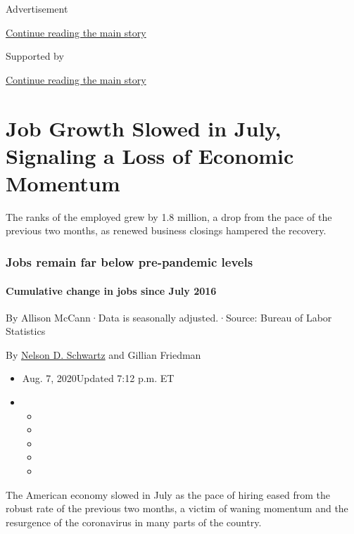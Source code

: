 Advertisement

\protect\hyperlink{after-top}{Continue reading the main story}

Supported by

\protect\hyperlink{after-sponsor}{Continue reading the main story}

\hypertarget{job-growth-slowed-in-july-signaling-a-loss-of-economic-momentum}{%
\section{Job Growth Slowed in July, Signaling a Loss of Economic
Momentum}\label{job-growth-slowed-in-july-signaling-a-loss-of-economic-momentum}}

The ranks of the employed grew by 1.8 million, a drop from the pace of
the previous two months, as renewed business closings hampered the
recovery.

\hypertarget{jobs-remain-far-below-pre-pandemic-levels}{%
\subsubsection{Jobs remain far below pre-pandemic
levels}\label{jobs-remain-far-below-pre-pandemic-levels}}

\hypertarget{cumulative-change-in-jobs-since-july-2016}{%
\paragraph{Cumulative change in jobs since July
2016}\label{cumulative-change-in-jobs-since-july-2016}}

By Allison McCann·Data is seasonally adjusted.·Source: Bureau of Labor
Statistics

By \href{https://www.nytimes3xbfgragh.onion/by/nelson-d-schwartz}{Nelson
D. Schwartz} and Gillian Friedman

\begin{itemize}
\item
  Aug. 7, 2020Updated 7:12 p.m. ET
\item
  \begin{itemize}
  \item
  \item
  \item
  \item
  \item
  \end{itemize}
\end{itemize}

The American economy slowed in July as the pace of hiring eased from the
robust rate of the previous two months, a victim of waning momentum and
the resurgence of the coronavirus in many parts of the country.

